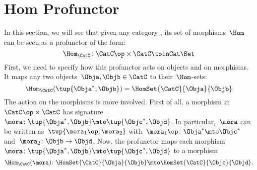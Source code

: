 \section{Hom Profunctor}
In this section, we will see that given any category \CatC, its set of morphisms~$\Hom$ can be seen as a profunctor of the form:
\begin{equation*}
    \Hom_\CatC\colon \CatC \op \times \CatC \toinCat \Set
\end{equation*}
First, we need to specify how this profunctor acts on objects and on morphisms.
It maps any two objects~$\Obja,\Objb\in \CatC$ to their~$\Hom$-sets:
\begin{equation*}
    \Hom_\CatC(\tup{\Obja^*,\Objb})=\HomSet{\CatC}{\Obja}{\Objb}
\end{equation*}
The action on the morphisms is more involved. First of all, a morphism in~$\CatC\op \times \CatC$ has signature~$\mora \colon \tup{\Obja^*,\Objb}\mto \tup{\Objc^*, \Objd}$.
In particular,~$\mora$ can be written as~$\tup{\mora_1\op,\mora_2}$ with~$\mora_1\op\colon \Obja^*\mto \Objc^*$ and~$\mora_2\colon \Objb\to \Objd$.
Now, the profunctor maps each morphism~$\mora \colon \tup{\Obja^*,\Objb}\mto \tup{\Objc^*, \Objd}$ to a morphism
\begin{equation*}
\Hom_\CatC(\mora)\colon \HomSet{\CatC}{\Obja}{\Objb}\mto \HomSet{\CatC}{\Objc}{\Objd}.
\end{equation*}

\devel{}


